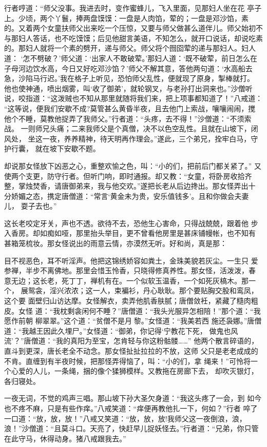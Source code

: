 行者哼道：“师父没事。我进去时，变作蜜蜂儿，飞入里面，见那妇人坐在花
亭子上。少顷，两个丫鬟，捧两盘馍馍：一盘是人肉馅，荤的；一盘是邓沙馅，素
的。又着两个女童扶师父出来吃一个压惊，又要与师父做甚么道伴儿。师父始初不
与那妇人答话，也不吃馍馍；后见他甜言美语，不知怎么，就开口说话，却说吃素
的。那妇人就将一个素的劈开，递与师父。师父将个囫囵荤的递与那妇人。妇人道：
‘怎不劈破？’师父道：‘出家人不敢破荤。’那妇人道：‘既不破荤，前日怎么在
子母河边饮水高，今日又好吃邓沙馅？’师父不解其意，答他两句道：‘水高船去
急，沙陷马行迟。’我在格子上听见，恐怕师父乱性，便就现了原身，掣棒就打。
他也使神通，喷出烟雾，叫‘收了御弟’，就轮钢叉，与老孙打出洞来也。”沙僧听
说，咬指道：“这泼贼也不知从那里就随将我们来，把上项事都知道了！”八戒道：
“这等说，便我们安歇不成?莫管甚么黄昏半夜，且去他门上索战，嚷嚷闹闹，搅
他个不睡，莫教他捉弄了我师父。”行者道：“头疼，去不得！”沙僧道：“不须索战。
一则师兄头痛；二来我师父是个真僧，决不以色空乱性。且就在山坡下，闭风处，
坐这一夜，养养精神，待天明再作理会。”遂此，三个弟兄，拴牢白马，守护行囊，
就在坡下安歇不题。

却说那女怪放下凶恶之心，重整欢愉之色，叫：“小的们，把前后门都关紧了。”
又使两个支更，防守行者。但听门响，即时通报。却又教：“女童，将卧房收拾齐
整，掌烛焚香，请唐御弟来，我与他交欢。”遂把长老从后边搀出。那女怪弄出十
分娇媚之态，携定唐僧道：“常言‘黄金未为贵，安乐值钱多’。且和你做会夫妻儿，
耍子去也。”

这长老咬定牙关，声也不透。欲待不去，恐他生心害命，只得战兢兢，跟着他
步入香房。却如痴如哑，那里抬头举目，更不曾看他房里是甚床铺幔帐，也不知有
甚箱笼梳妆。那女怪说出的雨意云情，亦漠然无听。好和尚，真是那：

目不视恶色，耳不听淫声。他把这锦绣娇容如粪土，金珠美貌若灰尘。一生只
爱参禅，半步不离佛地。那里会惜玉怜香，只晓得修真养性。那女怪，活泼泼，春
意无边；这长老，死丁丁，禅机有在。一个似软玉温香，一个如死灰槁木。那一个，
展鸳衾，淫兴浓浓；这一人，束褊衫，丹心耿耿。那个要贴胸交股和鸾凤，这个要
面壁归山访达摩。女怪解衣，卖弄他肌香肤腻；唐僧敛衽，紧藏了糙肉粗皮。女怪
道：“我枕剩衾闲何不睡？”唐僧道：“我头光服异怎相陪！”那个道：“我愿作前朝
柳翠翠。”这个道：“贫僧不是月黎。”女怪道：“我美若西
施还袅娜。”唐僧道：“我越王因此久埋尸。”女怪道：“御弟，你记得‘宁教花下死，
做鬼也风流’？”唐僧道：“我的真阳为至宝，怎肯轻与你这粉骷髅……”
他两个散言碎语的，直斗到更深，唐长老全不动念。那女怪扯扯拉拉的不放，这师
父只是老老成成的不肯。直缠到有半夜时候，把那怪弄得恼了，叫：“小的们，拿
绳来！”可怜将一个心爱的人儿，一条绳，捆的像个猱狮模样。又教拖在房廊下去，
却吹灭银灯，各归寝处。

一夜无词，不觉的鸡声三唱。那山坡下孙大圣欠身道：“我这头疼了一会，到
如今也不疼不麻，只是有些作痒。”八戒笑道：“痒便再教他扎一下，何如？”行者
啐了一口道：“放，放，放！”八戒又笑道：“放，放，放!我师父这一夜倒浪，浪，
浪！”沙僧道：“且莫斗口。天亮了，快赶早儿捉妖怪去。”行者道：“兄弟，你只管
在此守马，休得动身。猪八戒跟我去。”

